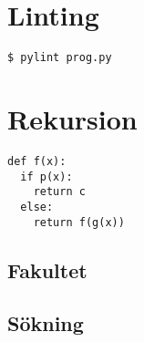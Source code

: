 \mode*

\section{Linting}

\begin{frame}[fragile]
  \begin{lstlisting}[numbers=none,basicstyle=\huge]
$ pylint prog.py
  \end{lstlisting}
\end{frame}

\section{Rekursion}

\begin{frame}[fragile]
  \begin{lstlisting}[basicstyle=\huge,numbers=none]
def f(x):
  if p(x):
    return c
  else:
    return f(g(x))
  \end{lstlisting}
\end{frame}

\subsection{Fakultet}

\begin{frame}[fragile]
  \begin{example}
    
  \end{example}
\end{frame}

\begin{frame}[fragile]
  \begin{example}
    
  \end{example}
\end{frame}

\subsection{Sökning}

\begin{frame}[fragile]
  \begin{example}
    
  \end{example}
\end{frame}

